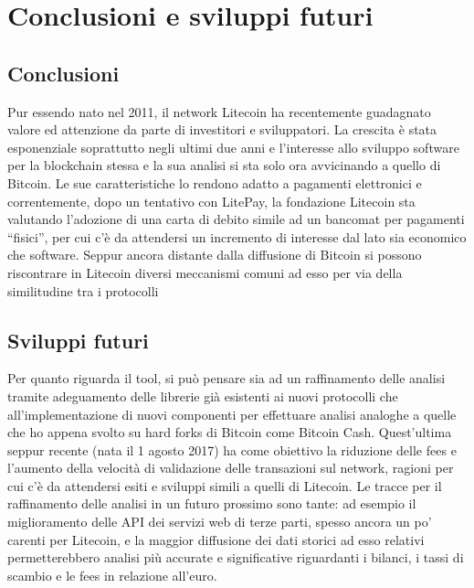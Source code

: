 \chapter{Conclusioni e sviluppi futuri}

\section{Conclusioni}
Pur essendo nato nel 2011, il network Litecoin ha recentemente guadagnato valore ed attenzione da parte di investitori e sviluppatori. La crescita è stata esponenziale soprattutto negli ultimi due anni e l’interesse allo sviluppo software per la blockchain stessa e la sua analisi si sta solo ora avvicinando a quello di Bitcoin. Le sue caratteristiche lo rendono adatto a pagamenti elettronici e correntemente, dopo un tentativo con LitePay, la fondazione Litecoin sta valutando l’adozione di una carta di debito simile ad un bancomat per pagamenti “fisici”, per cui c’è da attendersi un incremento di interesse dal lato sia economico che software.
Seppur ancora distante dalla diffusione di Bitcoin si possono riscontrare in Litecoin diversi meccanismi comuni ad esso per via della similitudine tra i protocolli


\section{Sviluppi futuri}

Per quanto riguarda il tool, si può pensare sia ad un raffinamento delle analisi tramite adeguamento delle librerie già esistenti ai nuovi protocolli che all'implementazione di nuovi componenti per effettuare analisi analoghe a quelle che ho appena svolto su hard forks di Bitcoin come Bitcoin Cash. Quest’ultima seppur recente (nata il 1 agosto 2017) ha come obiettivo la riduzione delle fees e l’aumento della velocità di validazione delle transazioni sul network, ragioni per cui c’è da attendersi esiti e sviluppi simili a quelli di Litecoin.
Le tracce per il raffinamento delle analisi in un futuro prossimo sono tante: ad esempio il miglioramento delle API dei servizi web di terze parti, spesso ancora un po' carenti per Litecoin, e la maggior diffusione dei dati storici ad esso relativi permetterebbero analisi più accurate e significative riguardanti i bilanci, i tassi di scambio e le fees in relazione all'euro.

